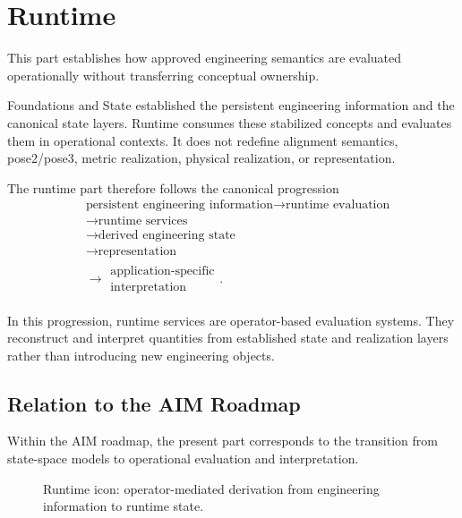 
\chapter*{Runtime}
{}

This part establishes how approved engineering semantics are evaluated
operationally without transferring conceptual ownership.

Foundations and State established the persistent engineering information
and the canonical state layers. Runtime consumes these stabilized
concepts and evaluates them in operational contexts. It does not
redefine alignment semantics, pose2/pose3, metric realization, physical
realization, or representation.

The runtime part therefore follows the canonical progression
\[
\begin{aligned}
&\text{persistent engineering information}
\rightarrow
\text{runtime evaluation}
\\
&\rightarrow
\text{runtime services}
\\
&\rightarrow
\text{derived engineering state}
\\
&\rightarrow
\text{representation}
\\
&\rightarrow
\substack{\text{application-specific}\\\text{interpretation}}.
\end{aligned}
\]

In this progression, runtime services are operator-based evaluation
systems. They reconstruct and interpret quantities from established
state and realization layers rather than introducing new engineering
objects.

\section*{Relation to the AIM Roadmap}

Within the AIM roadmap, the present part corresponds to the transition
from state-space models to operational evaluation and interpretation.

\begin{figure}[ht]
\centering

\caption{Runtime icon: operator-mediated derivation from engineering information to runtime state.}
\label{fig:icon-runtime-operator-chain}
\end{figure}

